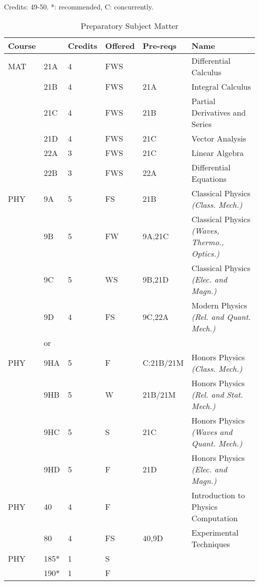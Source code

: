 \documentclass[12pt]{article}
\begin{document}
\begin{table}
\caption{\label{tbl:prep}Preparatory Subject Matter}
\noindent
\vskip 0.25cm
Credits:  49-50. *: recommended, C: concurrently.\\
\begin{tabular}{|llllll|}
\hline
Course & & Credits & Offered & Pre-reqs & Name \\
\hline
MAT & 21A & 4 & FWS & & Differential Calculus\\ 
    & 21B & 4 & FWS & 21A & Integral Calculus \\ 
    & 21C & 4 & FWS & 21B & Partial Derivatives and Series\\ 
    & 21D & 4 & FWS & 21C & Vector Analysis\\ 
    & 22A & 3 & FWS & 21C & Linear Algebra\\ 
    & 22B & 3 & FWS & 22A & Differential Equations\\ 
\hline
\hline
PHY & 9A & 5 & FS & 21B & Classical Physics {\it (Class. Mech.)}\\ 
    & 9B & 5 & FW & 9A,21C & Classical Physics {\it (Waves, Thermo., Optics.)}\\ 
    & 9C & 5 & WS & 9B,21D & Classical Physics {\it (Elec. and Magn.)}\\ 
    & 9D & 4 & FS & 9C,22A & Modern Physics {\it (Rel. and Quant. Mech.)}\\ 
\hline
&or&&\\
\hline
PHY & 9HA & 5 & F & C:21B/21M & Honors Physics {\it (Class. Mech.)}\\ 
    & 9HB & 5 & W & 21B/21M & Honors Physics {\it (Rel. and Stat. Mech.)}\\ 
    & 9HC & 5 & S & 21C & Honors Physics {\it (Waves and Quant. Mech.)}\\ 
    & 9HD & 5 & F & 21D & Honors Physics {\it (Elec. and Magn.)}\\ 
\hline
\hline
PHY & 40  & 4 & F & & Introduction to Physics Computation \\ 
    & 80  & 4 & FS & 40,9D & Experimental Techniques \\ 
PHY & 185* & 1 & S & & \\ 
    & 190* & 1 & F & & \\ 
\hline
\end{tabular}
\end{table}
\end{document}
